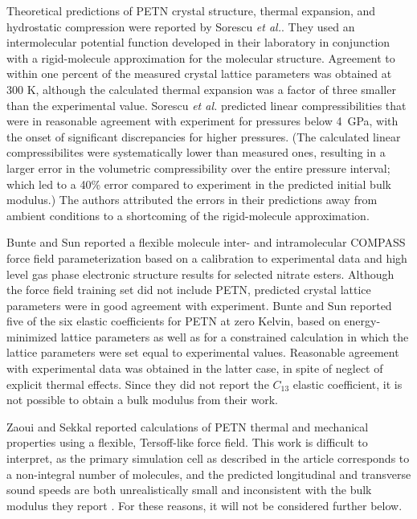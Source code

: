 \documentclass[prb,aps,nobibnotes,twocolumn,doublespace,twocolumngrid,superbib]{revtex4}
\begin{document}
Theoretical predictions of PETN crystal structure, thermal expansion, and 
hydrostatic compression were reported by Sorescu {\it et al.}\cite{Sorescu_1999v103A,
Sorescu_1999v103}.  They used an intermolecular potential function developed 
in their laboratory in conjunction with a rigid-molecule approximation for 
the molecular structure. Agreement to within one percent of the measured 
crystal lattice parameters was obtained at 300 K, although the calculated 
thermal expansion was a factor of three smaller than the experimental 
value.  Sorescu {\it et al.}\/  predicted linear compressibilities 
that were in reasonable agreement with experiment for pressures below 
4~GPa, with the onset of significant discrepancies for higher pressures.  (The 
calculated linear compressibilites were systematically lower than measured 
ones, resulting in a larger error in the volumetric compressibility 
over the entire pressure interval; which led to a 40\% error compared to 
experiment in the predicted initial bulk modulus.) The authors attributed 
the errors in their predictions away from ambient conditions to a shortcoming 
of the rigid-molecule approximation.

Bunte and Sun\cite{Bunte_2000v104}
reported a flexible molecule inter- and intramolecular COMPASS force field 
parameterization based on a calibration to experimental data and high level 
gas phase electronic structure results for selected nitrate esters.  
Although the force field training set did not include PETN, predicted 
crystal lattice parameters were in good agreement with experiment.  Bunte 
and Sun reported five of the six elastic coefficients for PETN at zero 
Kelvin, based on energy-minimized lattice parameters as well as for a
constrained calculation in which the lattice parameters were set equal to
experimental values.  Reasonable agreement with experimental data was obtained 
in the latter case, in spite of neglect of explicit thermal effects.  Since 
they did not report the $C_{13}$ elastic coefficient, it is not possible to 
obtain a bulk modulus from their work.

Zaoui and Sekkal\cite{Zaoui_2001v118} reported 
calculations of PETN thermal and mechanical properties using a flexible, 
Tersoff-like force field.  This work is difficult to interpret, as the 
primary simulation cell as described in the article corresponds to a 
non-integral number of molecules, and the predicted longitudinal and 
transverse sound speeds are both unrealistically small and inconsistent
with the bulk modulus they report .  For these reasons, it will not be 
considered further below.
\end{document}
